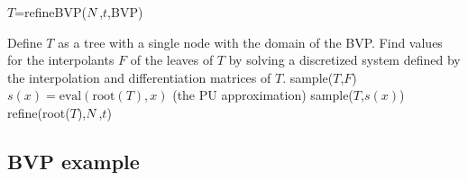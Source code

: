 \begin{algorithm}
\caption{$T$=refineBVP($N$,$t$,BVP)}
\label{alg7}
\begin{algorithmic}
\STATE Define $T$ as a tree with a single node with the domain of the BVP.
\STATE Find values for the interpolants $F$ of the leaves of $T$ by solving a discretized \ARP system defined by the interpolation and differentiation matrices of $T$.
\STATE sample($T$,$F$) 
\STATE $s(x) = \text{eval}(\text{root}(T),x)$ (the PU approximation)
\STATE sample($T$,$s(x)$)
\STATE refine(root($T$),$N$,$t$)
\ENDWHILE
\end{algorithmic}
\label{BVP_solve}
\end{algorithm}

\subsection{BVP example}
\label{BVP_SEC}
%
%
%

